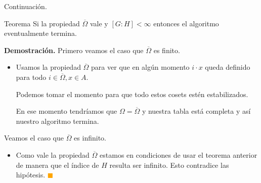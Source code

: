 \documentclass[aspectratio=169, 9pt]{beamer}
\renewcommand\qedsymbol{\textcolor{orange}{$\blacksquare$}}
\newcommand{\ol}{\overline}
\begin{document}
\begin{frame}[fragile]{Continuación.}
	\begin{alertblock}{Teorema}
		Si la propiedad $\ol \Omega$ vale y $[G:H] < \infty$ entonces el algoritmo eventualmente termina.
	\end{alertblock}
	
	
	\textbf{Demostración.} 
	Primero veamos el caso que $\ol \Omega$ es finito.
	\begin{itemize}
		
		\item Usamos la propiedad $\ol \Omega$ para ver que en algún momento $i \cdot x$ queda definido para todo $i \in \ol\Omega, x \in A$.
		 
		Podemos tomar el momento para que todo estos cosets estén estabilizados.
		
		En ese momento tendríamos que $\Omega = \ol \Omega$ y nuestra tabla está completa y así nuestro algoritmo termina.
	\end{itemize}
	
	Veamos el caso que $\ol \Omega$ es infinito.
	\begin{itemize}
		
		\item Como vale la propiedad $\ol \Omega$ estamos en condiciones de usar el teorema anterior de manera que el índice de $H$ resulta ser infinito.
		Esto contradice las hipótesis.
		\qedsymbol
	\end{itemize}
		
	
	
\end{frame}
\end{document}
